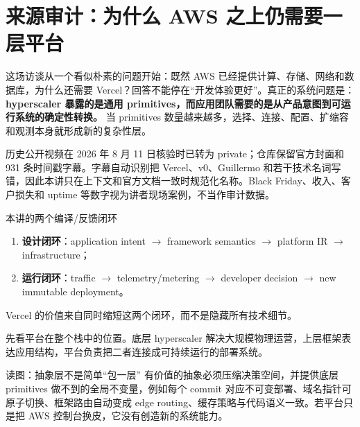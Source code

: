\section{来源审计：为什么 AWS 之上仍需要一层平台}

这场访谈从一个看似朴素的问题开始：既然 AWS 已经提供计算、存储、网络和数据库，为什么还需要 Vercel？回答不能停在“开发体验更好”。真正的系统问题是：\textbf{hyperscaler 暴露的是通用 primitives，而应用团队需要的是从产品意图到可运行系统的确定性转换。} 当 primitives 数量越来越多，选择、连接、配置、扩缩容和观测本身就形成新的复杂性层。

历史公开视频在 2026 年 8 月 11 日核验时已转为 private；仓库保留官方封面和 931 条时间戳字幕。字幕自动识别把 Vercel、v0、Guillermo 和若干技术名词写错，因此本讲只在上下文和官方文档一致时规范化名称。Black Friday、收入、客户损失和 uptime 等数字视为讲者现场案例，不当作审计数据。

\begin{importantbox}{本讲的两个编译/反馈闭环}
\begin{enumerate}
  \item \textbf{设计闭环}：application intent $\rightarrow$ framework semantics $\rightarrow$ platform IR $\rightarrow$ infrastructure；
  \item \textbf{运行闭环}：traffic $\rightarrow$ telemetry/metering $\rightarrow$ developer decision $\rightarrow$ new immutable deployment。
\end{enumerate}
Vercel 的价值来自同时缩短这两个闭环，而不是隐藏所有技术细节。
\end{importantbox}

先看平台在整个栈中的位置。底层 hyperscaler 解决大规模物理运营，上层框架表达应用结构，平台负责把二者连接成可持续运行的部署系统。


\begin{knowledgebox}{读图：抽象层不是简单“包一层”}
有价值的抽象必须压缩决策空间，并提供底层 primitives 做不到的全局不变量，例如每个 commit 对应不可变部署、域名指针可原子切换、框架路由自动变成 edge routing、缓存策略与代码语义一致。若平台只是把 AWS 控制台换皮，它没有创造新的系统能力。
\end{knowledgebox}

